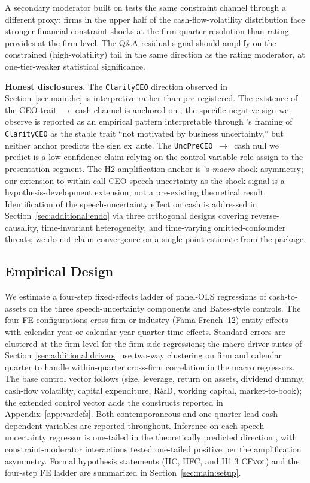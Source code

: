A secondary moderator built on  tests the same constraint channel through a different proxy: firms in the upper half of the cash-flow-volatility distribution face stronger financial-constraint shocks at the firm-quarter resolution than rating provides at the firm level. The Q\&A residual signal should amplify on the constrained (high-volatility) tail in the same direction as the rating moderator, at one-tier-weaker statistical significance.

\textbf{Honest disclosures.} The \texttt{ClarityCEO} direction observed in Section~\ref{sec:main:hc} is interpretive rather than pre-registered. The existence of the CEO-trait $\to$ cash channel is anchored on ; the specific negative sign we observe is reported as an empirical pattern interpretable through \citeauthor{dzielinski2021}'s framing of \texttt{ClarityCEO} as the stable trait ``not motivated by business uncertainty,'' but neither anchor predicts the sign ex~ante. The \texttt{UncPreCEO}~$\to$~cash null we predict is a low-confidence claim relying on the control-variable role \citeauthor{dzielinski2021} assign to the presentation segment. The H2 amplification anchor is \citeauthor{almeida2004}'s \emph{macro}-shock asymmetry; our extension to within-call CEO speech uncertainty as the shock signal is a hypothesis-development extension, not a pre-existing theoretical result. Identification of the speech-uncertainty effect on cash is addressed in Section~\ref{sec:additional:endo} via three orthogonal designs covering reverse-causality, time-invariant heterogeneity, and time-varying omitted-confounder threats; we do not claim convergence on a single point estimate from the package.

\subsection{Empirical Design}
\label{sec:framework:design}

We estimate a four-step fixed-effects ladder of panel-OLS regressions of cash-to-assets on the three speech-uncertainty components and Bates-style controls. The four FE configurations cross firm or industry (Fama-French~12) entity effects with calendar-year or calendar year-quarter time effects. Standard errors are clustered at the firm level for the firm-side regressions; the macro-driver suites of Section~\ref{sec:additional:drivers} use two-way clustering on firm and calendar quarter to handle within-quarter cross-firm correlation in the macro regressors. The base control vector follows \citeauthor{bates2009} (size, leverage, return on assets, dividend dummy, cash-flow volatility, capital expenditure, R\&D, working capital, market-to-book); the extended control vector adds the constructs reported in Appendix~\ref{app:vardefs}. Both contemporaneous and one-quarter-lead cash dependent variables are reported throughout. Inference on each speech-uncertainty regressor is one-tailed in the theoretically predicted direction \cite{opler1999,bertrand2003,almeida2004}, with constraint-moderator interactions tested one-tailed positive per the \citeauthor{almeida2004} amplification asymmetry. Formal hypothesis statements (\textsc{HC}, \textsc{HFC}, and \textsc{H1.3 CFvol}) and the four-step FE ladder are summarized in Section~\ref{sec:main:setup}.
